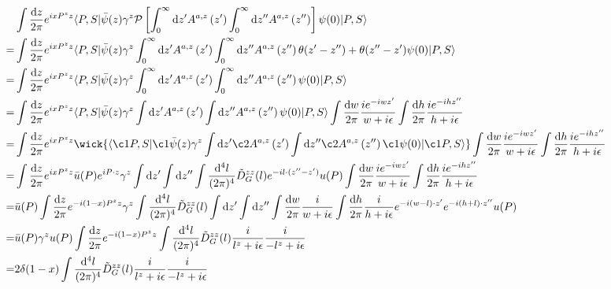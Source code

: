 \documentclass{article}
\DeclarePairedDelimiter\bracketM{[}{]}
\let\bqty\relax
\newcommand{\bqty}[1]{\bracketM*{#1}}
\newcommand{\mm}[1]{\frac{\dd^4#1}{(2\pi)^4}}
\begin{document}
\begin{align*}
	  & \int \frac{\dd z}{2 \pi} e^{i x P^{z} z}\langle P, S|\bar{\psi}(z) \gamma^z  \mathcal{P} \left[ \int_{0}^{\infty} \dd z^{\prime} A^{a,z}\left(z^{\prime}\right) \int_{0}^{\infty} \dd z^{\prime\prime} A^{a,z}\left(z^{\prime\prime}\right) \right]  \psi(0)| P, S\rangle                                                     \\
	= & \int \frac{\dd z}{2 \pi} e^{i x P^{z} z}\langle P, S|\bar{\psi}(z) \gamma^z \int_{0}^{\infty} \dd z^{\prime} A^{a,z}\left(z^{\prime}\right) \int_{0}^{\infty} \dd z^{\prime\prime} A^{a,z}\left(z^{\prime\prime}\right) \bqty{\theta(z'-z'')+\theta(z''-z')}  \psi(0)| P, S\rangle                                            \\
	= & \int \frac{\dd z}{2 \pi} e^{i x P^{z} z}\langle P, S|\bar{\psi}(z) \gamma^z \int_{0}^{\infty} \dd z^{\prime} A^{a,z}\left(z^{\prime}\right) \int_{0}^{\infty} \dd z^{\prime\prime} A^{a,z}\left(z^{\prime\prime}\right) \psi(0)| P, S\rangle                                                                                  \\
	= & \int \frac{\dd z}{2 \pi} e^{i x P^{z} z}\langle P, S|\bar{\psi}(z) \gamma^z \int \dd z^{\prime} A^{a,z}\left(z^{\prime}\right)\int \dd z^{\prime\prime} A^{a,z}\left(z^{\prime\prime}\right)  \psi(0)| P, S\rangle\int\frac{\dd w}{2\pi}\frac{ie^{-iwz' }}{w+i\epsilon}\int\frac{\dd h}{2\pi}\frac{ie^{-ihz'' }}{h+i\epsilon} \\
	= & \int \frac{\dd z}{2 \pi} e^{i x P^{z} z}\wick{\langle \c1P, S|\c1{\bar{\psi}}(z) \gamma^z \int \dd z^{\prime} \c2A^{a,z}\left(z^{\prime}\right)\int \dd z^{\prime\prime} \c2A^{a,z}\left(z^{\prime\prime}\right)  \c1\psi(0)| \c1P, S\rangle}
	\int\frac{\dd w}{2\pi}\frac{ie^{-iwz' }}{w+i\epsilon}\int\frac{\dd h}{2\pi}\frac{ie^{-ihz'' }}{h+i\epsilon}\\
	= & \int \frac{\dd z}{2 \pi} e^{i x P^{z} z}\bar u(P)e^{iP\cdot z} \gamma^z \int \dd z^{\prime} \int \dd z^{\prime\prime} \int\mm{l}\tilde D_G^{zz}(l)e^{-il\cdot(z''-z')}  u(P)
	\int\frac{\dd w}{2\pi}\frac{ie^{-iwz' }}{w+i\epsilon}\int\frac{\dd h}{2\pi}\frac{ie^{-ihz'' }}{h+i\epsilon}\\
	= & \bar u(P)\int \frac{\dd z}{2 \pi} e^{-i (1-x) P^{z} z} \gamma^z  \int\mm{l}\tilde D_G^{zz}(l)
	\int \dd z^{\prime} \int \dd z^{\prime\prime}\int\frac{\dd w}{2\pi}\frac{i}{w+i\epsilon}\int\frac{\dd h}{2\pi}\frac{i}{h+i\epsilon}e^{-i(w-l)\cdot z'}e^{-i(h+l)\cdot z''} u(P)\\
	= & \bar u(P) \gamma^zu(P) \int \frac{\dd z}{2 \pi} e^{-i (1-x) P^{z} z} \int\mm{l}\tilde D_G^{zz}(l)
	\frac{i}{l^z+i\epsilon}\frac{i}{-l^z+i\epsilon} \\
	= & 2\delta(1-x)\int\mm{l}\tilde D_G^{zz}(l)
	\frac{i}{l^z+i\epsilon}\frac{i}{-l^z+i\epsilon}
\end{align*}
\end{document}
